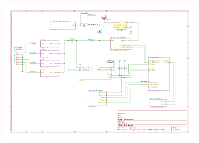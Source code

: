 \documentclass{article}
\begin{document}
{\begin{figure}[H]
	\centering
	\includegraphics[page=1,width=0.9\textwidth]{RFCxSchematics.pdf}
	\caption{}
	\label{fig:schemp1}
\end{figure}

\newpage
}
\end{document}
